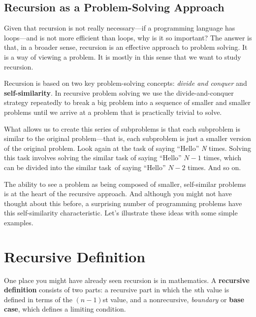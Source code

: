 \subsection{Recursion as a Problem-Solving Approach}
\noindent Given that recursion is not really necessary---if a
programming language has loops---and is not more efficient than loops,
why is it so important?  The answer is that, in a broader sense,
recursion is an effective approach to problem solving.  It is a way of
viewing a problem.  It is mostly in this sense that we want to study
recursion.

Recursion is based on two key problem-solving concepts: {\it
divide and conquer} and {\bf
self-similarity}.  In recursive problem solving
we use the divide-and-conquer strategy repeatedly to break a big
problem into a sequence of smaller and smaller problems until we
arrive at a problem that is practically trivial to solve.

What allows us to create this series
of subproblems is that each
subproblem is similar to the original problem---that is, each
subproblem is just a smaller version of the original problem.   Look
again at the task of saying ``Hello'' {\it N} times.  Solving this task
involves solving the similar task of saying ``Hello'' $N-1$ times,
which can be divided into the similar task~of saying ``Hello'' $N-2$
times.  And so on.

The ability to see a problem as being composed of smaller,
self-similar problems is at the heart of the recursive approach.  And
although you might not have thought about this before, a surprising
number of programming problems have this self-similarity
characteristic.   Let's illustrate these ideas with some simple
examples.



\section{Recursive Definition}
\label{recursive-definition}
\noindent One place you might have already seen recursion is in
mathematics.  A {\bf recursive definition}
consists of two parts: a recursive part in which the {\it n}th value
is defined in terms of the $(n-1)$st value, and a nonrecursive, {\em
boundary} or {\bf base case}, which defines a limiting condition.

